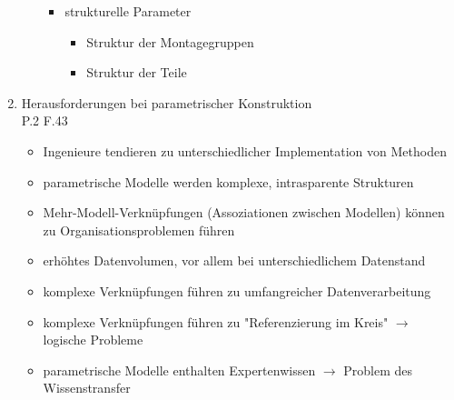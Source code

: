 \documentclass[10pt,a4paper,fleqn]{article}
\begin{document}
\begin{enumerate}
\begin{itemize}
\begin{itemize}
	 				\item strukturelle Parameter
	 					\begin{itemize}
	 						\item Struktur der Montagegruppen
	 						\item Struktur der Teile
	 					\end{itemize}
	 			\end{itemize}
	 	\end{itemize}
	 \item Herausforderungen bei parametrischer Konstruktion\\
	 	P.2 F.43
	 	\begin{itemize}
	 		\item Ingenieure tendieren zu unterschiedlicher Implementation von Methoden
	 		\item parametrische Modelle werden komplexe, intrasparente Strukturen
	 		\item Mehr-Modell-Verknüpfungen (Assoziationen zwischen Modellen) können zu Organisationsproblemen führen
	 		\item erhöhtes Datenvolumen, vor allem bei unterschiedlichem Datenstand
	 		\item komplexe Verknüpfungen führen zu umfangreicher Datenverarbeitung
	 		\item komplexe Verknüpfungen führen zu "Referenzierung im Kreis" $\rightarrow$ logische Probleme
	 		\item parametrische Modelle enthalten Expertenwissen $\rightarrow$ Problem des Wissenstransfer
	 	\end{itemize}

\end{enumerate}
\end{document}
